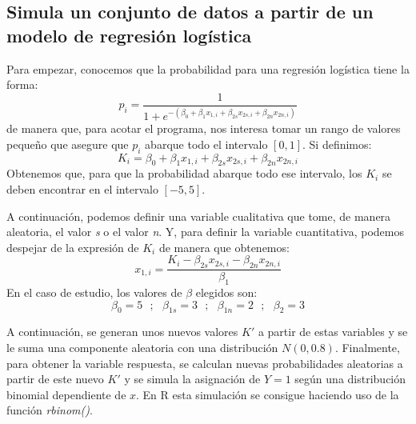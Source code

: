 \documentclass[12pt,a4paper]{article}
\begin{document}
\subsection{Simula un conjunto de datos a partir de un modelo de regresión logística}
Para empezar, conocemos que la probabilidad para una regresión logística tiene la forma:
\begin{equation}
    p_i = \frac{1}{1+e^{-(\beta_0 + \beta_1 x_{1,i}+\beta_{2s} x_{2s,i}+\beta_{2n}x_{2n,i})}}
\end{equation}
de manera que, para acotar el programa, nos interesa tomar un rango de valores pequeño que asegure que $p_i$ abarque todo el intervalo $[0,1]$. Si definimos:
\begin{equation}
    K_i = \beta_0 + \beta_1 x_{1,i}+\beta_{2s} x_{2s,i}+\beta_{2n}x_{2n,i}
\end{equation}
Obtenemos que, para que la probabilidad abarque todo ese intervalo, los $K_i$ se deben encontrar en el intervalo $[-5,5]$.



A continuación, podemos definir una variable cualitativa que tome, de manera aleatoria, el valor \textit{s} o el valor \textit{n}. Y, para definir la variable cuantitativa, podemos despejar de la expresión de $K_i$ de manera que obtenemos:
\begin{equation}
    x_{1,i} = \frac{K_i - \beta_{2s} x_{2s,i}-\beta_{2n}x_{2n,i}}{\beta_1}
\end{equation}
En el caso de estudio, los valores de $\beta$ elegidos son:
\begin{equation*}
    \beta_0 = 5 \ \ \ ;\ \ \ \beta_{1s} = 3 \ \ \ ;\ \ \ \beta_{1n} = 2 \ \ \ ;\ \ \  \beta_{2} = 3
\end{equation*}

A continuación, se generan unos nuevos valores $K'$ a partir de estas variables y se le suma una componente aleatoria con una distribución $N(0,0\text{.}8)$. 
Finalmente, para obtener la variable respuesta, se calculan nuevas probabilidades aleatorias a partir de este nuevo $K'$ y se simula la asignación de $Y=1$ según una distribución binomial dependiente de $x$. En R esta simulación se consigue haciendo uso de la función \textit{rbinom()}.
\end{document}
